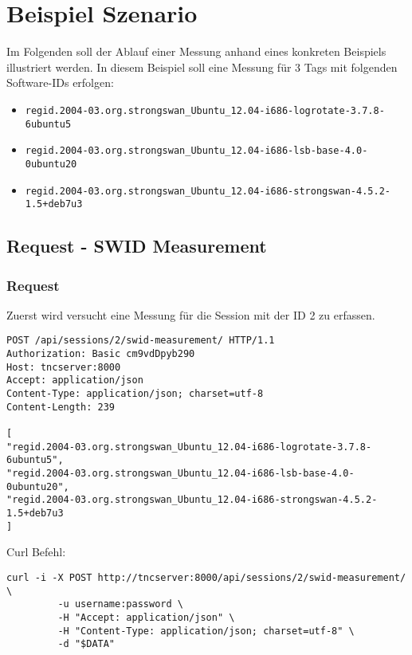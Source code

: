 \documentclass[10pt,a4paper]{scrartcl}
\begin{document}
\pagebreak
\section{Beispiel Szenario}
Im Folgenden soll der Ablauf einer Messung anhand eines konkreten Beispiels
illustriert werden. In diesem Beispiel soll eine Messung für 3 Tags mit
folgenden Software-IDs erfolgen:
\begin{itemize}
	\item \texttt{regid.2004-03.org.strongswan\_Ubuntu\_12.04-i686-logrotate-3.7.8-6ubuntu5}
	\item \texttt{regid.2004-03.org.strongswan\_Ubuntu\_12.04-i686-lsb-base-4.0-0ubuntu20}
	\item \texttt{regid.2004-03.org.strongswan\_Ubuntu\_12.04-i686-strongswan-4.5.2-1.5+deb7u3}
\end{itemize}

\subsection{Request - SWID Measurement}

\subsubsection{Request}

Zuerst wird versucht eine Messung für die Session mit der ID 2 zu erfassen.

\begin{small}\begin{lstlisting}
POST /api/sessions/2/swid-measurement/ HTTP/1.1
Authorization: Basic cm9vdDpyb290
Host: tncserver:8000
Accept: application/json
Content-Type: application/json; charset=utf-8
Content-Length: 239

[
"regid.2004-03.org.strongswan_Ubuntu_12.04-i686-logrotate-3.7.8-6ubuntu5",
"regid.2004-03.org.strongswan_Ubuntu_12.04-i686-lsb-base-4.0-0ubuntu20",
"regid.2004-03.org.strongswan_Ubuntu_12.04-i686-strongswan-4.5.2-1.5+deb7u3
]
\end{lstlisting}\end{small}

Curl Befehl:

\begin{small}\begin{lstlisting}
curl -i -X POST http://tncserver:8000/api/sessions/2/swid-measurement/ \
		 -u username:password \
		 -H "Accept: application/json" \
		 -H "Content-Type: application/json; charset=utf-8" \
		 -d "$DATA"
\end{lstlisting}\end{small}
\end{document}
